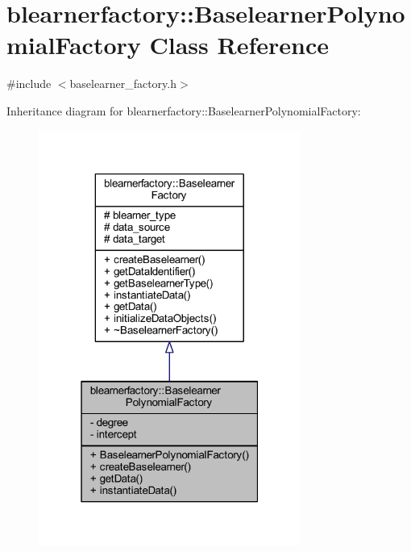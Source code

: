 \hypertarget{classblearnerfactory_1_1_baselearner_polynomial_factory}{}\section{blearnerfactory\+:\+:Baselearner\+Polynomial\+Factory Class Reference}
\label{classblearnerfactory_1_1_baselearner_polynomial_factory}


{\ttfamily \#include $<$baselearner\+\_\+factory.\+h$>$}



Inheritance diagram for blearnerfactory\+:\+:Baselearner\+Polynomial\+Factory\+:
\nopagebreak
\begin{figure}[H]
\begin{center}
\leavevmode
\includegraphics[width=244pt]{classblearnerfactory_1_1_baselearner_polynomial_factory__inherit__graph}
\end{center}
\end{figure}


